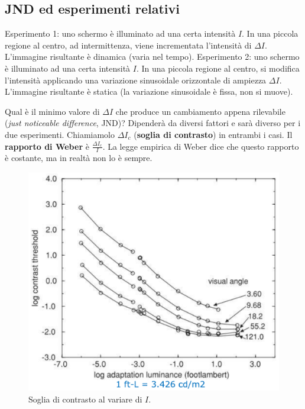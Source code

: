 \documentclass[a4paper,11pt]{article}
\begin{document}
\subsection{JND ed esperimenti relativi}
Esperimento 1: uno schermo è illuminato ad una certa intensità $I$. In una piccola regione al centro, ad intermittenza, viene incrementata
l'intensità di $\Delta I$. L'immagine risultante è dinamica (varia nel tempo).
\newline
Esperimento 2: uno schermo è illuminato ad una certa intensità $I$. In una piccola regione al centro, si modifica l'intensità
applicando una variazione sinusoidale orizzontale di ampiezza $\Delta I$.  L'immagine risultante è statica (la variazione sinusoidale è fissa, non si muove).
\par
Qual è il minimo valore di $\Delta I$ che produce un cambiamento appena rilevabile (\textit{just noticeable difference}, JND)? Dipenderà da diversi
fattori e sarà diverso per i due esperimenti. Chiamiamolo $\Delta I_c$ (\textbf{soglia di contrasto}) in entrambi i casi.
Il \textbf{rapporto di Weber} è $\frac{\Delta I_c}{I}$. La legge empirica di Weber dice che questo rapporto è costante, ma in realtà non lo è sempre.

\newpage
\renewcommand{\thefigure}{2.6}
\begin{figure}[!h]
  \centering
    \includegraphics[scale=0.8]{images/2/contrast_threshold.png}
    \caption{Soglia di contrasto al variare di $I$.}
\end{figure}
\end{document}
